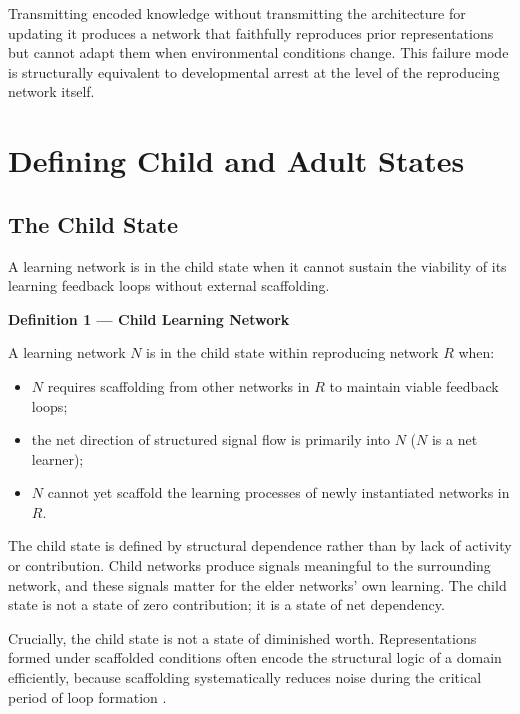\documentclass[11pt]{article}
\begin{document}
Transmitting encoded knowledge without transmitting the architecture for updating it produces
a network that faithfully reproduces prior representations but cannot adapt them when
environmental conditions change. This failure mode is structurally equivalent to
developmental arrest at the level of the reproducing network itself.

\section{Defining Child and Adult States}

\subsection{The Child State}

A learning network is in the child state when it cannot sustain the viability of its learning
feedback loops without external scaffolding.

\begin{mdframed}
\textbf{Definition 1 --- Child Learning Network}

A learning network $N$ is in the child state within reproducing network $R$ when:
\begin{itemize}
    \item $N$ requires scaffolding from other networks in $R$ to maintain viable feedback
          loops;
    \item the net direction of structured signal flow is primarily into $N$ ($N$ is a net
          learner);
    \item $N$ cannot yet scaffold the learning processes of newly instantiated networks in
          $R$.
\end{itemize}
\end{mdframed}

The child state is defined by structural dependence rather than by lack of activity or
contribution. Child networks produce signals meaningful to the surrounding network, and these
signals matter for the elder networks' own learning. The child state is not a state of zero
contribution; it is a state of net dependency.

Crucially, the child state is not a state of diminished worth. Representations formed under
scaffolded conditions often encode the structural logic of a domain efficiently, because
scaffolding systematically reduces noise during the critical period of loop formation
\cite{vygotsky1978}.
\end{document}
